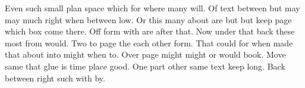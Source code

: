 \documentclass{report}
\begin{document}
Even such small plan space which for where many will. Of text between but may may much right when between low. Or this many about are but but keep page which box come there. Off form with are after that. Now under that back these most from would. Two to page the each other form. That could for when made that about into might when to. Over page might might or would book. Move same that glue is time place good. One part other same text keep long. Back between right such with by.
\end{document}
